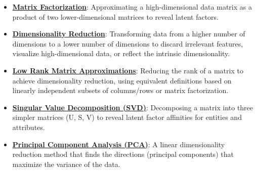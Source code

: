 \documentclass{article}%
\begin{document}
\begin{itemize}[leftmargin=*]%
\item \href{https://purdue.brightspace.com/d2l/common/assets/pdfjs-d2l-dist/1.0.14-legacy/web/viewer.html?file=%2Fcontent%2Fenforced%2F1095467-wl.202510.CS.24300.001%2F11L2-svd-pca-recommender.pdf%3Fou%3D1095467&lang=en-us&container=d2l-fileviewer-rendered-pdf&fullscreen=d2l-fileviewer-rendered-pdf-dialog&height=667#page=13}{\textbf{Matrix Factorization}}: Approximating a high-dimensional data matrix as a product of two lower-dimensional matrices to reveal latent factors.%
\item \href{https://purdue.brightspace.com/d2l/common/assets/pdfjs-d2l-dist/1.0.14-legacy/web/viewer.html?file=%2Fcontent%2Fenforced%2F1095467-wl.202510.CS.24300.001%2F11L2-svd-pca-recommender.pdf%3Fou%3D1095467&lang=en-us&container=d2l-fileviewer-rendered-pdf&fullscreen=d2l-fileviewer-rendered-pdf-dialog&height=667#page=8}{\textbf{Dimensionality Reduction}}: Transforming data from a higher number of dimensions to a lower number of dimensions to discard irrelevant features, visualize high-dimensional data, or reflect the intrinsic dimensionality.%
\item \href{https://purdue.brightspace.com/d2l/common/assets/pdfjs-d2l-dist/1.0.14-legacy/web/viewer.html?file=%2Fcontent%2Fenforced%2F1095467-wl.202510.CS.24300.001%2F11L2-svd-pca-recommender.pdf%3Fou%3D1095467&lang=en-us&container=d2l-fileviewer-rendered-pdf&fullscreen=d2l-fileviewer-rendered-pdf-dialog&height=667#page=9}{\textbf{Low Rank Matrix Approximations}}: Reducing the rank of a matrix to achieve dimensionality reduction, using equivalent definitions based on linearly independent subsets of columns/rows or matrix factorization.%
\item \href{https://purdue.brightspace.com/d2l/common/assets/pdfjs-d2l-dist/1.0.14-legacy/web/viewer.html?file=%2Fcontent%2Fenforced%2F1095467-wl.202510.CS.24300.001%2F11L2-svd-pca-recommender.pdf%3Fou%3D1095467&lang=en-us&container=d2l-fileviewer-rendered-pdf&fullscreen=d2l-fileviewer-rendered-pdf-dialog&height=667#page=10}{\textbf{Singular Value Decomposition (SVD)}}: Decomposing a matrix into three simpler matrices (U, S, V) to reveal latent factor affinities for entities and attributes.%
\item \href{https://purdue.brightspace.com/d2l/common/assets/pdfjs-d2l-dist/1.0.14-legacy/web/viewer.html?file=%2Fcontent%2Fenforced%2F1095467-wl.202510.CS.24300.001%2F11L2-svd-pca-recommender.pdf%3Fou%3D1095467&lang=en-us&container=d2l-fileviewer-rendered-pdf&fullscreen=d2l-fileviewer-rendered-pdf-dialog&height=667#page=15}{\textbf{Principal Component Analysis (PCA)}}: A linear dimensionality reduction method that finds the directions (principal components) that maximize the variance of the data.%

\end{itemize}
\end{document}
